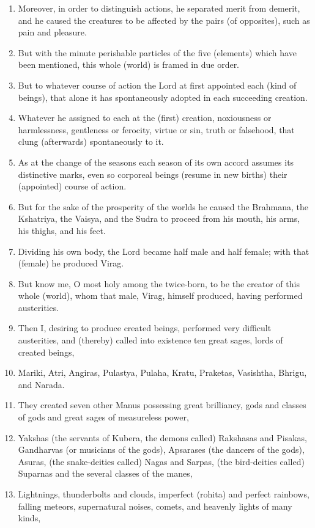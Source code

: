 \begin{enumerate}
\item Moreover, in order to distinguish actions, he separated merit from demerit, and he caused the creatures to be affected by the pairs (of opposites), such as pain and pleasure.
\item But with the minute perishable particles of the five (elements) which have been mentioned, this whole (world) is framed in due order.
\item But to whatever course of action the Lord at first appointed each (kind of beings), that alone it has spontaneously adopted in each succeeding creation.
\item Whatever he assigned to each at the (first) creation, noxiousness or harmlessness, gentleness or ferocity, virtue or sin, truth or falsehood, that clung (afterwards) spontaneously to it.
\item As at the change of the seasons each season of its own accord assumes its distinctive marks, even so corporeal beings (resume in new births) their (appointed) course of action.
\item But for the sake of the prosperity of the worlds he caused the Brahmana, the Kshatriya, the Vaisya, and the Sudra to proceed from his mouth, his arms, his thighs, and his feet.
\item Dividing his own body, the Lord became half male and half female; with that (female) he produced Virag.
\item But know me, O most holy among the twice-born, to be the creator of this whole (world), whom that male, Virag, himself produced, having performed austerities.
\item Then I, desiring to produce created beings, performed very difficult austerities, and (thereby) called into existence ten great sages, lords of created beings,
\item Mariki, Atri, Angiras, Pulastya, Pulaha, Kratu, Praketas, Vasishtha, Bhrigu, and Narada.
\item They created seven other Manus possessing great brilliancy, gods and classes of gods and great sages of measureless power,
\item Yakshas (the servants of Kubera, the demons called) Rakshasas and Pisakas, Gandharvas (or musicians of the gods), Apsarases (the dancers of the gods), Asuras, (the snake-deities called) Nagas and Sarpas, (the bird-deities called) Suparnas and the several classes of the manes,
\item Lightnings, thunderbolts and clouds, imperfect (rohita) and perfect rainbows, falling meteors, supernatural noises, comets, and heavenly lights of many kinds,

\end{enumerate}
